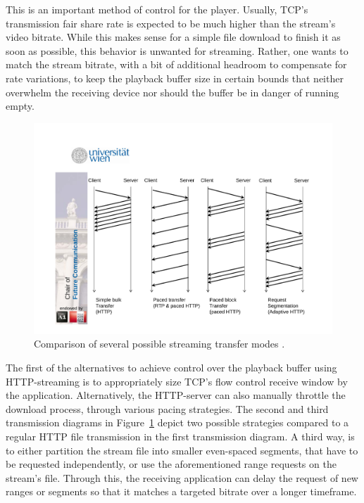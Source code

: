 This is an important method of control for the player. Usually, \gls{TCP}'s transmission fair share rate is expected to be much higher than the stream's video bitrate. While this makes sense for a simple file download to finish it as soon as possible, this behavior is unwanted for streaming. Rather, one wants to match the stream bitrate, with a bit of additional headroom to compensate for rate variations, to keep the playback buffer size in certain bounds that neither overwhelm the receiving device nor should the buffer be in danger of running empty. 

\begin{figure}[htbp]
\centering
\includegraphics[width=1.0\textwidth]{images/streaming-transfer-modes.pdf}
\caption{Comparison of several possible streaming transfer modes \cite{ma2011mobile}.}
\label{c3:fig:streamingtransfermodes}
\end{figure}


The first of the alternatives to achieve control over the playback buffer using \gls{HTTP}-streaming is to appropriately size \gls{TCP}'s flow control receive window by the application. 
Alternatively, the \gls{HTTP}-server can also manually throttle the download process, through various pacing strategies. The second and third transmission diagrams in Figure~\ref{c3:fig:streamingtransfermodes} depict two possible strategies compared to a regular \gls{HTTP} file transmission in the first transmission diagram. A third way, is to either partition the stream file into smaller even-spaced segments, that have to be requested independently, or use the aforementioned range requests on the stream's file. Through this, the receiving application can delay the request of new ranges or segments so that it matches a targeted bitrate over a longer timeframe.

